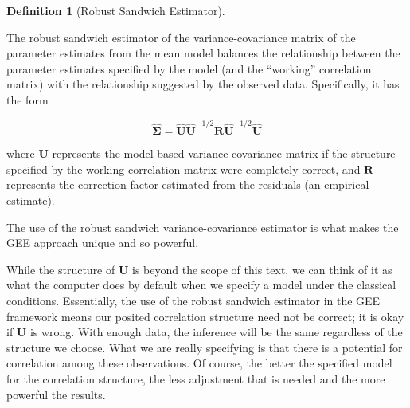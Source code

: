 \documentclass[
  letterpaper,
  DIV=11,
  numbers=noendperiod]{scrreprt}
\theoremstyle{definition}
\theoremstyle{definition}
\newtheorem{definition}{Definition}[chapter]
\theoremstyle{remark}
\begin{document}
\begin{definition}[Robust Sandwich
Estimator]\protect\hypertarget{def-robust-sandwich-estimator}{}\label{def-robust-sandwich-estimator}

The robust sandwich estimator of the variance-covariance matrix of the
parameter estimates from the mean model balances the relationship
between the parameter estimates specified by the model (and the
``working'' correlation matrix) with the relationship suggested by the
observed data. Specifically, it has the form

\[\widehat{\boldsymbol{\Sigma}} = \widehat{\mathbf{U}} \widehat{\mathbf{U}}^{-1/2} \mathbf{R} \widehat{\mathbf{U}}^{-1/2} \widehat{\mathbf{U}}\]

where \(\mathbf{U}\) represents the model-based variance-covariance
matrix if the structure specified by the working correlation matrix were
completely correct, and \(\mathbf{R}\) represents the correction factor
estimated from the residuals (an empirical estimate).

\end{definition}

\begin{tcolorbox}[enhanced jigsaw, bottomrule=.15mm, titlerule=0mm, bottomtitle=1mm, colback=white, coltitle=black, rightrule=.15mm, leftrule=.75mm, toprule=.15mm, toptitle=1mm, left=2mm, opacityback=0, colframe=quarto-callout-tip-color-frame, breakable, title=\textcolor{quarto-callout-tip-color}{\faLightbulb}\hspace{0.5em}{Big Idea}, arc=.35mm, colbacktitle=quarto-callout-tip-color!10!white, opacitybacktitle=0.6]

The use of the robust sandwich variance-covariance estimator is what
makes the GEE approach unique and so powerful.

\end{tcolorbox}

While the structure of \(\mathbf{U}\) is beyond the scope of this text,
we can think of it as what the computer does by default when we specify
a model under the classical conditions. Essentially, the use of the
robust sandwich estimator in the GEE framework means our posited
correlation structure need not be correct; it is okay if \(\mathbf{U}\)
is wrong. With enough data, the inference will be the same regardless of
the structure we choose. What we are really specifying is that there is
a potential for correlation among these observations. Of course, the
better the specified model for the correlation structure, the less
adjustment that is needed and the more powerful the results.
\end{document}
